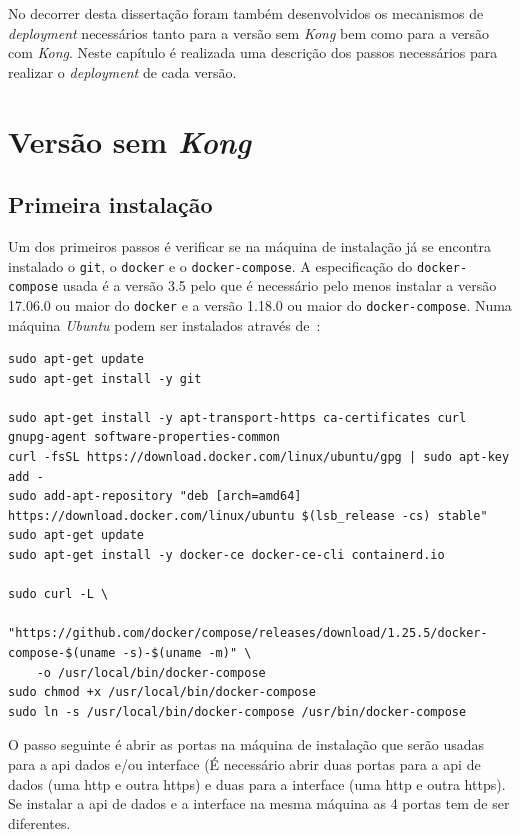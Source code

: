 No decorrer desta dissertação foram também desenvolvidos os mecanismos de \textit{deployment} necessários tanto para a versão sem \textit{Kong} bem como para a versão com \textit{Kong}. Neste capítulo é realizada uma descrição dos passos necessários para realizar o \textit{deployment} de cada versão.

\section{Versão sem \textit{Kong}}\label{sec:deployNoKong}

\subsection{Primeira instalação}\label{sec:inst-prim}

Um dos primeiros passos é verificar se na máquina de instalação já se encontra instalado o \texttt{git}, o \texttt{docker} e o \texttt{docker-compose}. A especificação do \texttt{docker-compose} usada é a versão 3.5 pelo que é necessário pelo menos instalar a versão 17.06.0 ou maior do \texttt{docker} e a versão 1.18.0 ou maior do \texttt{docker-compose}. Numa máquina \textit{Ubuntu} podem ser instalados através de~\cite{installDocker,installDC}:
\begin{lstlisting}[caption=Instalar \textit{docker} e \textit{docker-compose}]
sudo apt-get update
sudo apt-get install -y git

sudo apt-get install -y apt-transport-https ca-certificates curl gnupg-agent software-properties-common
curl -fsSL https://download.docker.com/linux/ubuntu/gpg | sudo apt-key add -
sudo add-apt-repository "deb [arch=amd64] https://download.docker.com/linux/ubuntu $(lsb_release -cs) stable"
sudo apt-get update
sudo apt-get install -y docker-ce docker-ce-cli containerd.io

sudo curl -L \
    "https://github.com/docker/compose/releases/download/1.25.5/docker-compose-$(uname -s)-$(uname -m)" \
    -o /usr/local/bin/docker-compose
sudo chmod +x /usr/local/bin/docker-compose
sudo ln -s /usr/local/bin/docker-compose /usr/bin/docker-compose
\end{lstlisting}

O passo seguinte é abrir as portas na máquina de instalação que serão usadas para a \acrshort{api} dados e/ou interface (É necessário abrir duas portas para a \acrshort{api} de dados (uma \acrshort{http} e outra \acrshort{https}) e duas para a interface (uma \acrshort{http} e outra \acrshort{https}). Se instalar a \acrshort{api} de dados e a interface na mesma máquina as 4 portas tem de ser diferentes.

